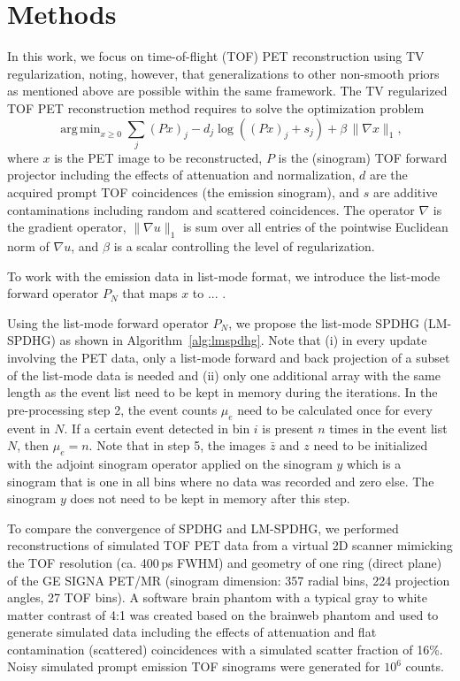 \documentclass{IEEEtran}
\DeclareMathOperator*{\argmin}{arg\,min}
\begin{document}
\section{Methods}

In this work, we focus on time-of-flight (TOF) PET reconstruction using TV regularization, 
noting, however, that generalizations to other non-smooth priors as mentioned above are possible 
within the same framework. 
The TV regularized TOF PET reconstruction method requires to solve the optimization problem
%
\begin{equation}
\argmin _{x\geq 0} \sum_j (Px)_j -  d_j \log \left( (Px)_ j + s_j \right) + \beta \, \|\nabla x\|_{1},
\end{equation}
%
where $x$ is the PET image to be reconstructed, $P$ is the (sinogram) TOF forward projector including 
the effects of attenuation and normalization, $d$ are the acquired prompt TOF coincidences 
(the emission sinogram), and $s$ are additive contaminations including random and scattered coincidences.
The operator $\nabla$ is the gradient operator, $\|\nabla u \|_1$ is sum over all entries of the 
pointwise Euclidean norm of $\nabla u$, and $\beta$ is a scalar controlling the level of regularization.

To work with the emission data in list-mode format, we introduce the list-mode forward operator $P_N$
that maps $x$ to ... 
. 

Using the list-mode forward operator $P_N$, we propose the list-mode SPDHG (LM-SPDHG) as shown
in Algorithm~\ref{alg:lmspdhg}.
Note that (i) in every update involving the PET data, only a list-mode forward and back projection of
a subset of the list-mode data is needed and (ii) only one additional array with the same length
as the event list need to be kept in memory during the iterations.
In the pre-processing step 2, the event counts $\mu_e$ need to be calculated once for every event in $N$.
If a certain event detected in bin $i$ is present $n$ times in the event list $N$, then $\mu_e = n$.
Note that in step 5, the images $\bar{z}$ and $z$ need to be initialized with the adjoint sinogram
operator applied on the sinogram $y$ which is a sinogram that is one in all bins where no data was
recorded and zero else. The sinogram $y$ does not need to be kept in memory after this step.

To compare the convergence of SPDHG and LM-SPDHG, we performed reconstructions of simulated
TOF PET data from a virtual 2D scanner mimicking the TOF resolution (ca. 400\,ps FWHM) and 
geometry of one ring (direct plane) of the GE SIGNA PET/MR (sinogram dimension: 
357 radial bins, 224 projection angles, 27 TOF bins).
A software brain phantom with a typical gray to white matter contrast of 4:1 was created
based on the brainweb phantom and used to generate simulated data including the effects
of attenuation and flat contamination (scattered) coincidences
with a simulated scatter fraction of 16\%.
Noisy simulated prompt emission TOF sinograms were generated for $10^6$ counts.
\end{document}
